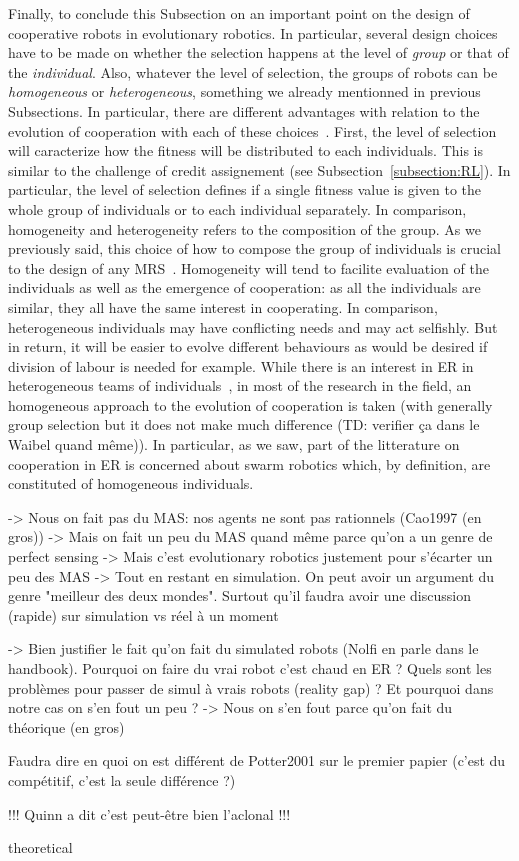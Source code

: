     Finally, to conclude this Subsection on an important point on the design of cooperative robots in evolutionary robotics. In particular, several design choices have to be made on whether the selection happens at the level of \emph{group} or that of the \emph{individual}. Also, whatever the level of selection, the groups of robots can be \emph{homogeneous} or \emph{heterogeneous}, something we already mentionned in previous Subsections. In particular, there are different advantages with relation to the evolution of cooperation with each of these choices~\parencite{Waibel2009}. First, the level of selection will caracterize how the fitness will be distributed to each individuals. This is similar to the challenge of credit assignement (see Subsection~\ref{subsection:RL}). In particular, the level of selection defines if a single fitness value is given to the whole group of individuals or to each individual separately. In comparison, homogeneity and heterogeneity refers to the composition of the group. As we previously said, this choice of how to compose the group of individuals is crucial to the design of any MRS~\parencite{Quinn2003}. Homogeneity will tend to facilite evaluation of the individuals as well as the emergence of cooperation: as all the individuals are similar, they all have the same interest in cooperating. In comparison, heterogeneous individuals may have conflicting needs and may act selfishly. But in return, it will be easier to evolve different behaviours as would be desired if division of labour is needed for example. While there is an interest in ER in heterogeneous teams of individuals~\parencite{Lichocki2013}, in most of the research in the field, an homogeneous approach to the evolution of cooperation is taken (with generally group selection but it does not make much difference (TD: verifier ça dans le Waibel quand même)). In particular, as we saw, part of the litterature on cooperation in ER is concerned about swarm robotics which, by definition, are constituted of homogeneous individuals.


    -> Nous on fait pas du MAS: nos agents ne sont pas rationnels (Cao1997 (en gros))
          -> Mais on fait un peu du MAS quand même parce qu'on a un genre de perfect sensing
          -> Mais c'est evolutionary robotics justement pour s'écarter un peu des MAS
          -> Tout en restant en simulation. On peut avoir un argument du genre "meilleur des deux mondes". Surtout qu'il faudra avoir une discussion (rapide) sur simulation vs réel à un moment

    -> Bien justifier le fait qu'on fait du simulated robots (Nolfi en parle dans le handbook). Pourquoi on faire du vrai robot c'est chaud en ER ? Quels sont les problèmes pour passer de simul à vrais robots (reality gap) ? Et pourquoi dans notre cas on s'en fout un peu ? 
          -> Nous on s'en fout parce qu'on fait du théorique (en gros)

    Faudra dire en quoi on est différent de Potter2001 sur le premier papier (c'est du compétitif, c'est la seule différence ?)

    !!! Quinn a dit c'est peut-être bien l'aclonal !!!

    theoretical
